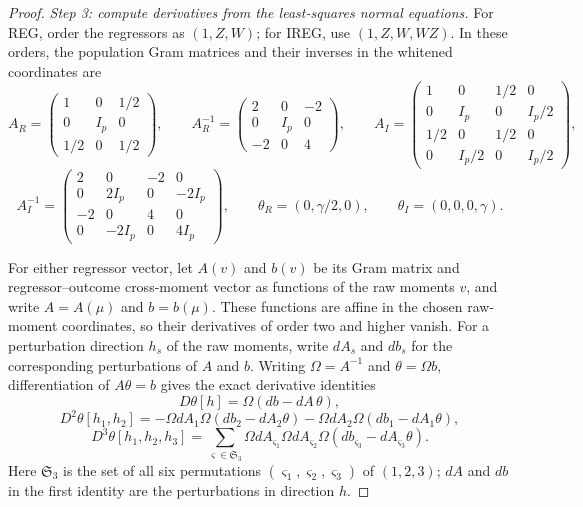 \documentclass{article}
\theoremstyle{plain}
\theoremstyle{definition}
\theoremstyle{remark}
\begin{document}
\begin{proof}
\emph{Step 3: compute derivatives from the least-squares normal equations.}
For REG, order the regressors as $(1,Z,W)$; for IREG, use
$(1,Z,W,WZ)$. In these orders, the population Gram matrices and their
inverses in the whitened coordinates are
\[
A_R=
\begin{pmatrix}
1&0&1/2\\
0&I_p&0\\
1/2&0&1/2
\end{pmatrix},
\qquad
A_R^{-1}=
\begin{pmatrix}
2&0&-2\\
0&I_p&0\\
-2&0&4
\end{pmatrix},
\qquad
A_I=
\begin{pmatrix}
1&0&1/2&0\\
0&I_p&0&I_p/2\\
1/2&0&1/2&0\\
0&I_p/2&0&I_p/2
\end{pmatrix},
\]
\[
A_I^{-1}
=
\begin{pmatrix}
2&0&-2&0\\
0&2I_p&0&-2I_p\\
-2&0&4&0\\
0&-2I_p&0&4I_p
\end{pmatrix},
\qquad
\theta_R=(0,\gamma/2,0),
\qquad
\theta_I=(0,0,0,\gamma).
\]

For either regressor vector, let $A(v)$ and $b(v)$ be its Gram
matrix and regressor--outcome cross-moment vector as functions
of the raw moments $v$, and write $A=A(\mu)$ and $b=b(\mu)$.
These functions are affine in the chosen raw-moment coordinates,
so their derivatives of order two and higher vanish.
For a perturbation direction $h_s$ of the raw moments, write $dA_s$
and $db_s$ for the corresponding perturbations of $A$ and $b$.
Writing $\Omega=A^{-1}$ and $\theta=\Omega b$, differentiation of
$A\theta=b$ gives the exact derivative identities
\[
D\theta[h]
=
\Omega(db-dA\,\theta),
\]
\[
D^2\theta[h_1,h_2]
=
-\Omega dA_1\Omega(db_2-dA_2\theta)
-\Omega dA_2\Omega(db_1-dA_1\theta),
\]
\[
D^3\theta[h_1,h_2,h_3]
=
\sum_{\varsigma\in\mathfrak S_3}
\Omega dA_{\varsigma_1}\Omega dA_{\varsigma_2}
\Omega(db_{\varsigma_3}-dA_{\varsigma_3}\theta).
\]
Here $\mathfrak S_3$ is the set of all six permutations
$(\varsigma_1,\varsigma_2,\varsigma_3)$ of $(1,2,3)$;
$dA$ and $db$ in the first identity are the perturbations in direction $h$.


\end{proof}
\end{document}
